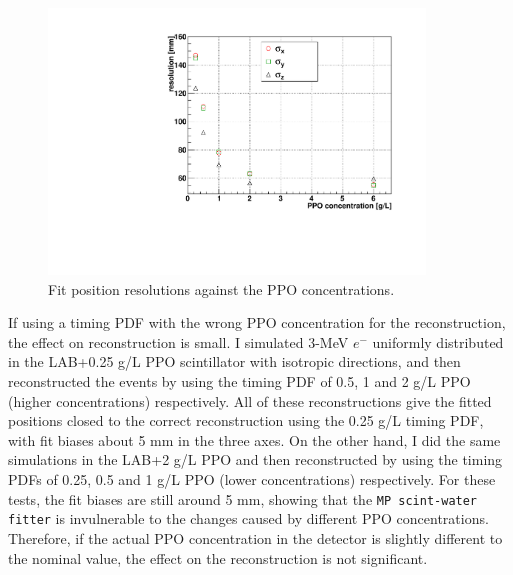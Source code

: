 \begin{figure}[!htb]
	\centering
	\includegraphics[width=10cm]{partialResolVsPPO.pdf}
	\caption{Fit position resolutions against the PPO concentrations.}
	\label{fig:partialResolVsPPO}
\end{figure}

If using a timing PDF with the wrong PPO concentration for the reconstruction, the effect on reconstruction is small\cite{partialFitterPDFtestInvulnerable}. I simulated 3-MeV $e^-$ uniformly distributed in the LAB+0.25 g/L PPO scintillator with isotropic directions, and then reconstructed the events by using the timing PDF of 0.5, 1 and 2 g/L PPO (higher concentrations) respectively. All of these reconstructions give the fitted positions closed to the correct reconstruction using the 0.25 g/L timing PDF, with fit biases about 5 mm in the three axes. On the other hand, I did the same simulations in the LAB+2 g/L PPO and then reconstructed by using the timing PDFs of 0.25, 0.5 and 1 g/L PPO (lower concentrations) respectively. For these tests, the fit biases are still around 5 mm, showing that the \texttt{MP scint-water fitter} is invulnerable to the changes caused by different PPO concentrations. Therefore, if the actual PPO concentration in the detector is slightly different to the nominal value, the effect on the reconstruction is not significant.

